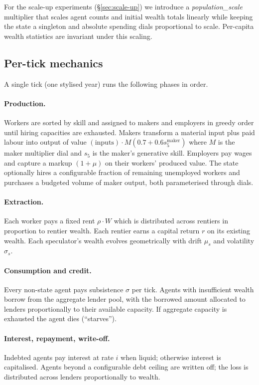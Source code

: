 \documentclass[11pt]{article}
\begin{document}
For the scale-up experiments (\S\ref{sec:scale-up}) we introduce a
\emph{population\_scale} multiplier that scales agent counts and initial
wealth totals linearly while keeping the state a singleton and absolute
spending dials proportional to scale. Per-capita wealth statistics are
invariant under this scaling.

\subsection{Per-tick mechanics}

A single tick (one stylised year) runs the following phases in order.

\paragraph{Production.} Workers are sorted by skill and assigned to
makers and employers in greedy order until hiring capacities are
exhausted. Makers transform a material input plus paid labour into
output of value
$(\text{inputs}) \cdot M (0.7 + 0.6 s_5^{\text{maker}})$
where $M$ is the maker multiplier dial and $s_5$ is the maker's
generative skill. Employers pay wages and capture a markup
$(1 + \mu)$ on their workers' produced value. The
state optionally hires a configurable fraction of remaining unemployed
workers and purchases a budgeted volume of maker output, both
parameterised through dials.

\paragraph{Extraction.} Each worker pays a fixed rent
$\rho \cdot W$ which is distributed across rentiers in proportion to
rentier wealth. Each rentier earns a capital return $r$ on its existing
wealth. Each speculator's wealth evolves geometrically with drift
$\mu_s$ and volatility $\sigma_s$.

\paragraph{Consumption and credit.} Every non-state agent pays
subsistence $\sigma$ per tick. Agents with insufficient wealth borrow
from the aggregate lender pool, with the borrowed amount allocated to
lenders proportionally to their available capacity. If aggregate
capacity is exhausted the agent dies (``starves'').

\paragraph{Interest, repayment, write-off.} Indebted agents pay interest
at rate $i$ when liquid; otherwise interest is capitalised. Agents
beyond a configurable debt ceiling are written off; the loss is
distributed across lenders proportionally to wealth.
\end{document}
